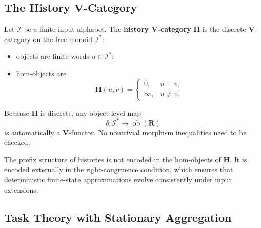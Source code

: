 \documentclass[12pt]{article}
\theoremstyle{definition}
\begin{document}
\subsection{The History $\mathbf V$-Category}
\label{subsec:history-category}

Let $\mathcal I$ be a finite input alphabet.  The \textbf{history
$\mathbf V$-category} $\mathbf H$ is the discrete $\mathbf V$-category on the
free monoid $\mathcal I^*$:
\begin{itemize}[nosep]
\item objects are finite words $u\in\mathcal I^*$;
\item hom-objects are
\[
\mathbf H(u,v)=
\begin{cases}
0,&u=v,\\
\infty,&u\neq v.
\end{cases}
\]
\end{itemize}

Because $\mathbf H$ is discrete, any object-level map
\[
\delta:\mathcal I^*\to\operatorname{ob}(\mathbf R)
\]
is automatically a $\mathbf V$-functor.  No nontrivial morphism inequalities
need to be checked.

The prefix structure of histories is not encoded in the hom-objects of
$\mathbf H$.  It is encoded externally in the right-congruence condition,
which ensures that deterministic finite-state approximations evolve
consistently under input extensions.

\subsection{Task Theory with Stationary Aggregation}
\label{subsec:task-theory}
\end{document}
